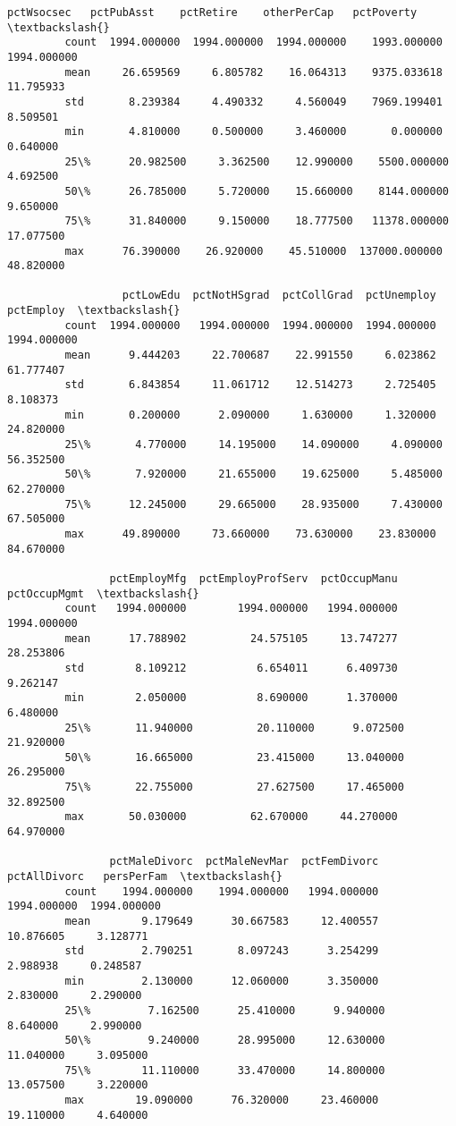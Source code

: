 \documentclass[11pt]{llncs}
\begin{document}
\begin{Verbatim}[commandchars=\\\{\}]
                 pctWsocsec   pctPubAsst    pctRetire    otherPerCap   pctPoverty  \textbackslash{}
         count  1994.000000  1994.000000  1994.000000    1993.000000  1994.000000   
         mean     26.659569     6.805782    16.064313    9375.033618    11.795933   
         std       8.239384     4.490332     4.560049    7969.199401     8.509501   
         min       4.810000     0.500000     3.460000       0.000000     0.640000   
         25\%      20.982500     3.362500    12.990000    5500.000000     4.692500   
         50\%      26.785000     5.720000    15.660000    8144.000000     9.650000   
         75\%      31.840000     9.150000    18.777500   11378.000000    17.077500   
         max      76.390000    26.920000    45.510000  137000.000000    48.820000   
         
                  pctLowEdu  pctNotHSgrad  pctCollGrad  pctUnemploy    pctEmploy  \textbackslash{}
         count  1994.000000   1994.000000  1994.000000  1994.000000  1994.000000   
         mean      9.444203     22.700687    22.991550     6.023862    61.777407   
         std       6.843854     11.061712    12.514273     2.725405     8.108373   
         min       0.200000      2.090000     1.630000     1.320000    24.820000   
         25\%       4.770000     14.195000    14.090000     4.090000    56.352500   
         50\%       7.920000     21.655000    19.625000     5.485000    62.270000   
         75\%      12.245000     29.665000    28.935000     7.430000    67.505000   
         max      49.890000     73.660000    73.630000    23.830000    84.670000   
         
                pctEmployMfg  pctEmployProfServ  pctOccupManu  pctOccupMgmt  \textbackslash{}
         count   1994.000000        1994.000000   1994.000000   1994.000000   
         mean      17.788902          24.575105     13.747277     28.253806   
         std        8.109212           6.654011      6.409730      9.262147   
         min        2.050000           8.690000      1.370000      6.480000   
         25\%       11.940000          20.110000      9.072500     21.920000   
         50\%       16.665000          23.415000     13.040000     26.295000   
         75\%       22.755000          27.627500     17.465000     32.892500   
         max       50.030000          62.670000     44.270000     64.970000   
         
                pctMaleDivorc  pctMaleNevMar  pctFemDivorc  pctAllDivorc   persPerFam  \textbackslash{}
         count    1994.000000    1994.000000   1994.000000   1994.000000  1994.000000   
         mean        9.179649      30.667583     12.400557     10.876605     3.128771   
         std         2.790251       8.097243      3.254299      2.988938     0.248587   
         min         2.130000      12.060000      3.350000      2.830000     2.290000   
         25\%         7.162500      25.410000      9.940000      8.640000     2.990000   
         50\%         9.240000      28.995000     12.630000     11.040000     3.095000   
         75\%        11.110000      33.470000     14.800000     13.057500     3.220000   
         max        19.090000      76.320000     23.460000     19.110000     4.640000   
         

\end{Verbatim}
\end{document}
